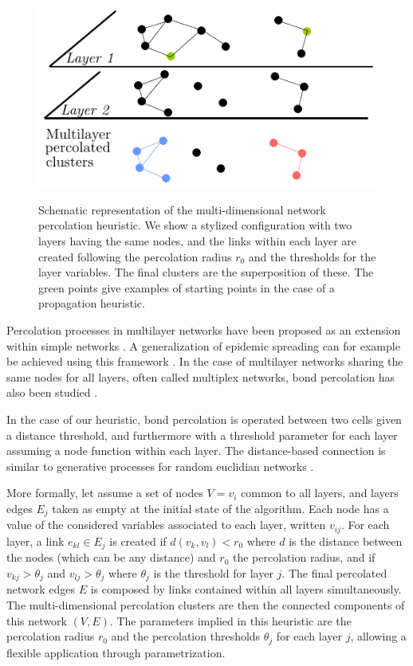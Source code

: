 \documentclass{jimis-en}
\begin{document}
\begin{figure}[ht] 
  {\includegraphics[width=\linewidth]{figures/principle.pdf}}
  \centering
  \caption{Schematic representation of the multi-dimensional network percolation heuristic. We show a stylized configuration with two layers having the same nodes, and the links within each layer are created following the percolation radius $r_0$ and the thresholds for the layer variables. The final clusters are the superposition of these. The green points give examples of starting points in the case of a propagation heuristic.\label{fig:method}}
\end{figure}


Percolation processes in multilayer networks have been proposed as an extension within simple networks \citep{boccaletti2014structure}. A generalization of epidemic spreading can for example be achieved using this framework \citep{son2012percolation}. In the case of multilayer networks sharing the same nodes for all layers, often called multiplex networks, bond percolation has also been studied \citep{hackett2016bond}.


In the case of our heuristic, bond percolation is operated between two cells given a distance threshold, and furthermore with a threshold parameter for each layer assuming a node function within each layer. The distance-based connection is similar to generative processes for random euclidian networks \citep{penrose1999k}.

More formally, let assume a set of nodes $V = v_i$ common to all layers, and layers edges $E_j$ taken as empty at the initial state of the algorithm. Each node has a value of the considered variables associated to each layer, written $v_{ij}$. For each layer, a link $e_{kl} \in E_j$ is created if $d(v_k,v_l) < r_0$ where $d$ is the distance between the nodes (which can be any distance) and $r_0$ the percolation radius, and if $v_{kj} > \theta_j$ and $v_{lj} > \theta_j$ where $\theta_j$ is the threshold for layer $j$. The final percolated network edges $E$ is composed by links contained within all layers simultaneously. The multi-dimensional percolation clusters are then the connected components of this network $(V,E)$. The parameters implied in this heuristic are the percolation radius $r_0$ and the percolation thresholds $\theta_j$ for each layer $j$, allowing a flexible application through parametrization.
\end{document}
